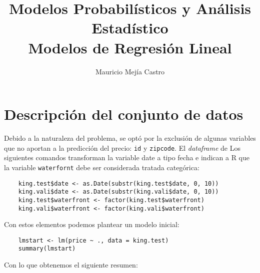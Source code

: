 \documentclass[10pt,letterpaper]{article}
\title{Modelos Probabilísticos y Análisis Estadístico\\Modelos de Regresión Lineal}
\author{Mauricio Mejía Castro}
\begin{document}
	\maketitle

\section{Descripción del conjunto de datos}
Debido a la naturaleza del problema, se optó por la exclusión de algunas variables que no aportan a la predicción del precio: {\tt id} y {\tt zipcode}. El {\em dataframe} de Los siguientes comandos transforman la variable date a tipo fecha e indican a R que la variable {\tt waterfornt} debe ser considerada tratada categórica:

\begin{verbatim}
	king.test$date <- as.Date(substr(king.test$date, 0, 10))
	king.vali$date <- as.Date(substr(king.vali$date, 0, 10))
	king.test$waterfront <- factor(king.test$waterfront)
	king.vali$waterfront <- factor(king.vali$waterfront)
\end{verbatim}

Con estos elementos podemos plantear un modelo inicial:

\begin{verbatim}
	lmstart <- lm(price ~ ., data = king.test)
	summary(lmstart)
\end{verbatim}

Con lo que obtenemos el siguiente resumen:
\end{document}
